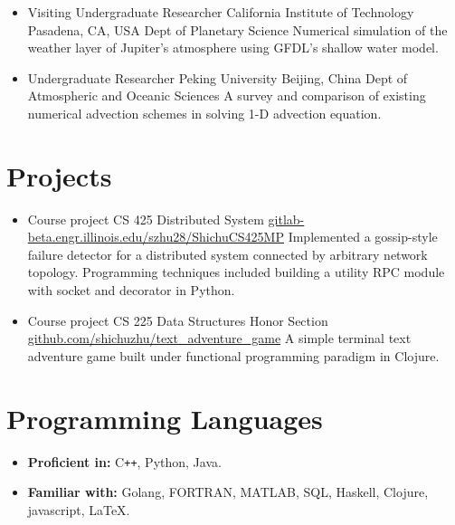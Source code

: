 \documentclass[11pt,a4paper,sans]{moderncv}        %
\begin{document}
\begin{itemize}
	\item{
	      {Visiting Undergraduate Researcher}
	      {California Institute of Technology}
	      {Pasadena, CA, USA}
	      {Dept of Planetary Science}
	      {Numerical simulation of the weather layer of Jupiter's atmosphere using GFDL's shallow water model.}
	      }
	      
	\item{
	      {Undergraduate Researcher}
	      {Peking University}
	      {Beijing, China}
	      {Dept of Atmospheric and Oceanic Sciences}
	      {A survey and comparison of existing numerical advection schemes in solving 1-D advection equation.}
	      }
	      
\end{itemize}

\section{Projects}
\begin{itemize}
	\item{
	      {Course project}
	      {\vspace{-10pt}}
	      {}
	      {CS 425 Distributed System}
	      {
		      \href{https://gitlab-beta.engr.illinois.edu/szhu28/ShichuCS425MP}{\faGitlab gitlab-beta.engr.illinois.edu/szhu28/ShichuCS425MP}
		      Implemented a gossip-style failure detector for a distributed system connected by arbitrary network topology. Programming techniques included building a utility RPC module with socket and decorator in Python.}
	      }
	      
	\item{
	      {Course project}
	      {\vspace{-10pt}}
	      {}
	      {CS 225 Data Structures Honor Section}
	      {
		      \href{https://github.com/shichuzhu/text_adventure_game}{\faGithub github.com/shichuzhu/text\_adventure\_game}
		      A simple terminal text adventure game built under functional programming paradigm in Clojure.}
		  }
	      
\end{itemize}

\section{Programming Languages}
\vspace{6pt}
\begin{itemize}
	\item \textbf{Proficient in:} C\texttt{++}, Python, Java.
	\item \textbf{Familiar with:} Golang, FORTRAN, MATLAB, SQL, Haskell, Clojure, javascript, \LaTeX.
\end{itemize}
\end{document}
